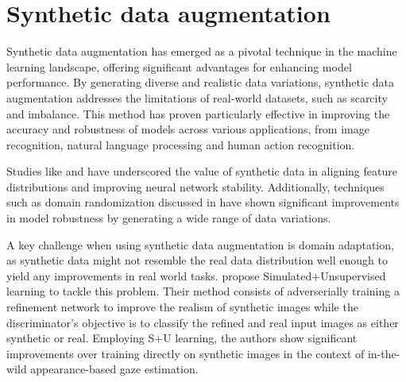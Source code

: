 







\section{Synthetic data augmentation}
Synthetic data augmentation has emerged as a pivotal technique in the machine learning landscape, offering significant advantages for enhancing model performance. By generating diverse and realistic data variations, synthetic data augmentation addresses the limitations of real-world datasets, such as scarcity and imbalance. This method has proven particularly effective in improving the accuracy and robustness of models across various applications, from image recognition, natural language processing and human action recognition.

Studies like \cite{peng2017synthetic} and \cite{Zheng_2016} have underscored the value of synthetic data in aligning feature distributions and improving neural network stability. Additionally, techniques such as domain randomization discussed in \cite{Tremblay_2018} have shown significant improvements in model robustness by generating a wide range of data variations. 

A key challenge when using synthetic data augmentation is domain adaptation, as synthetic data might not resemble the real data distribution well enough to yield any improvements in real world tasks. \cite{Shrivastava_2017} propose Simulated+Unsupervised learning to tackle this problem. Their method consists of adverserially training a refinement network to improve the realism of synthetic images while the discriminator's objective is to classify the refined and real input images as either synthetic or real. Employing S+U learning, the authors show significant improvements over training directly on synthetic images in the context of in-the-wild appearance-based gaze estimation. 

